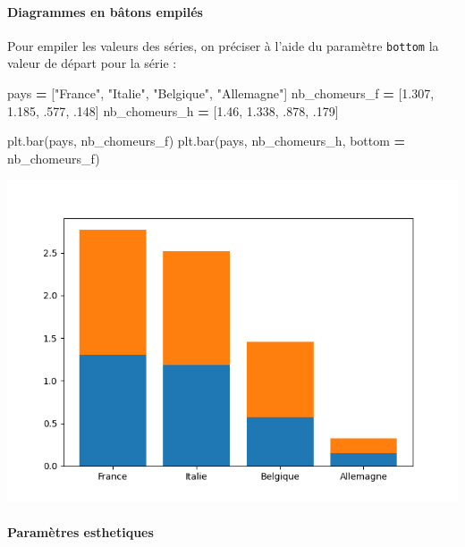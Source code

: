\documentclass[
  12pt,
]{book}
\newenvironment{Shaded}{\begin{snugshade}}{\end{snugshade}}
\newcommand{\FloatTok}[1]{\textcolor[rgb]{0.00,0.00,0.81}{#1}}
\newcommand{\NormalTok}[1]{#1}
\newcommand{\OperatorTok}[1]{\textcolor[rgb]{0.81,0.36,0.00}{\textbf{#1}}}
\newcommand{\StringTok}[1]{\textcolor[rgb]{0.31,0.60,0.02}{#1}}
\numberwithin{equation}{section}
\numberwithin{countremarque}{section}
\begin{document}
\paragraph{Diagrammes en bâtons empilés}\label{diagrammes-en-buxe2tons-empiluxe9s}

Pour empiler les valeurs des séries, on préciser à l'aide du paramètre \texttt{bottom} la valeur de départ pour la série :

\begin{Shaded}
\begin{Highlighting}[]
\NormalTok{pays }\OperatorTok{=}\NormalTok{ [}\StringTok{"France"}\NormalTok{, }\StringTok{"Italie"}\NormalTok{, }\StringTok{"Belgique"}\NormalTok{, }\StringTok{"Allemagne"}\NormalTok{]}
\NormalTok{nb\_chomeurs\_f }\OperatorTok{=}\NormalTok{ [}\FloatTok{1.307}\NormalTok{, }\FloatTok{1.185}\NormalTok{, }\FloatTok{.577}\NormalTok{, }\FloatTok{.148}\NormalTok{]}
\NormalTok{nb\_chomeurs\_h }\OperatorTok{=}\NormalTok{ [}\FloatTok{1.46}\NormalTok{, }\FloatTok{1.338}\NormalTok{, }\FloatTok{.878}\NormalTok{, }\FloatTok{.179}\NormalTok{]}

\NormalTok{plt.bar(pays, nb\_chomeurs\_f)}
\NormalTok{plt.bar(pays, nb\_chomeurs\_h, bottom }\OperatorTok{=}\NormalTok{ nb\_chomeurs\_f)}
\end{Highlighting}
\end{Shaded}

\begin{center}\includegraphics[width=9.03in]{figs/pyplot/barplot_stack} \end{center}

\paragraph{Paramètres esthetiques}\label{paramuxe8tres-esthetiques}
\end{document}
